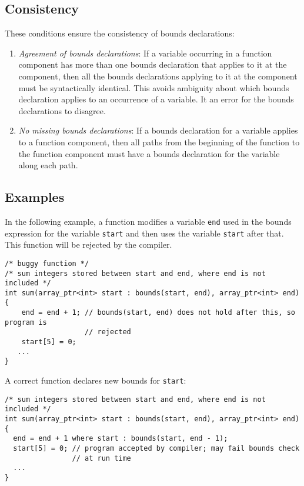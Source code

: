  \subsection{Consistency}

These conditions ensure the consistency of bounds declarations:

\begin{enumerate}
\item
  \emph{Agreement of bounds declarations}: If a variable occurring in a
  function component has more than one bounds declaration that applies
  to it at the component, then all the bounds declarations applying to
  it at the component must be syntactically identical. This avoids
  ambiguity about which bounds declaration applies to an occurrence of a
  variable. It an error for the bounds declarations to disagree.
\item
  \emph{No missing bounds declarations}: If a bounds declaration for a
  variable applies to a function component, then all paths from the
  beginning of the function to the function component must have a bounds
  declaration for the variable along each path.
\end{enumerate}

\subsection{Examples}
\label{examples:consistency}

In the following example, a function modifies a variable \texttt{end}
used in the bounds expression for the variable \texttt{start} and then
uses the variable \texttt{start} after that. This function will be
rejected by the compiler.

\begin{lstlisting}
/* buggy function */
/* sum integers stored between start and end, where end is not included */
int sum(array_ptr<int> start : bounds(start, end), array_ptr<int> end)
{ 
    end = end + 1; // bounds(start, end) does not hold after this, so program is
                   // rejected
    start[5] = 0;
   ...
}
\end{lstlisting}

A correct function declares new bounds for \texttt{start}:

\begin{lstlisting}
/* sum integers stored between start and end, where end is not included */
int sum(array_ptr<int> start : bounds(start, end), array_ptr<int> end)
{ 
  end = end + 1 where start : bounds(start, end - 1);
  start[5] = 0; // program accepted by compiler; may fail bounds check 
                // at run time
  ...
}
\end{lstlisting}

